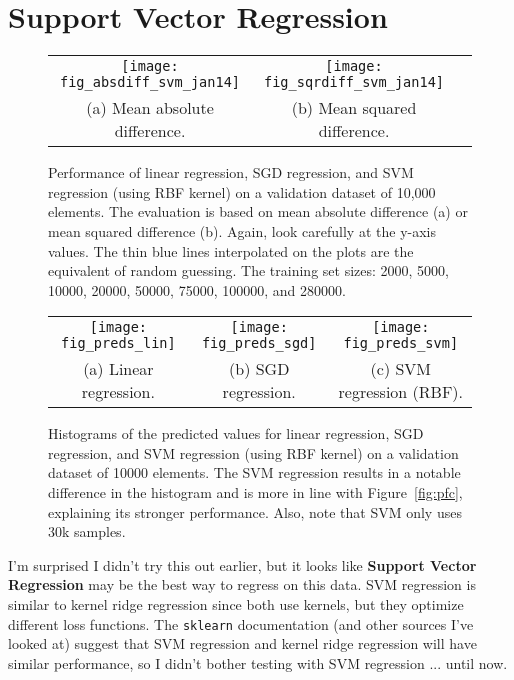 \documentclass[a4paper, 11pt]{article}
\begin{document}
\section{Support Vector Regression}

\begin{figure}[t]
\begin{center}
\begin{tabular}{c@{}c@{}c}
\texttt{[image: fig\_absdiff\_svm\_jan14]} &
\texttt{[image: fig\_sqrdiff\_svm\_jan14]} \\
(a) Mean absolute difference. &
(b) Mean squared difference. \\
\end{tabular}
\end{center}
\caption{Performance of linear regression, SGD regression, and SVM regression (using RBF kernel) on
a validation dataset of 10,000 elements. The evaluation is based on mean absolute difference (a) or
mean squared difference (b). Again, look carefully at the y-axis values. The thin blue lines
interpolated on the plots are the equivalent of random guessing. The training set sizes: 2000, 5000,
10000, 20000, 50000, 75000, 100000, and 280000.}
\label{fig:svr_results}
\end{figure}

\begin{figure}[t]
\begin{center}
\begin{tabular}{c@{}c@{}c}
\texttt{[image: fig\_preds\_lin]} &
\texttt{[image: fig\_preds\_sgd]} &
\texttt{[image: fig\_preds\_svm]} \\
(a) Linear regression. &
(b) SGD regression. &
(c) SVM regression (RBF). \\
\end{tabular}
\end{center}
\caption{Histograms of the predicted values for linear regression, SGD regression, and SVM
regression (using RBF kernel) on a validation dataset of 10000 elements. The SVM regression results
in a notable difference in the histogram and is more in line with Figure~\ref{fig:pfc}, explaining
its stronger performance. Also, note that SVM only uses 30k samples.}
\label{fig:svr_histograms}
\end{figure}

I'm surprised I didn't try this out earlier, but it looks like \textbf{Support Vector Regression}
may be the best way to regress on this data. SVM regression is similar to kernel ridge regression
since both use kernels, but they optimize different loss functions. The \texttt{sklearn}
documentation (and other sources I've looked at) suggest that SVM regression and kernel ridge
regression will have similar performance, so I didn't bother testing with SVM regression ... until
now.
\end{document}
